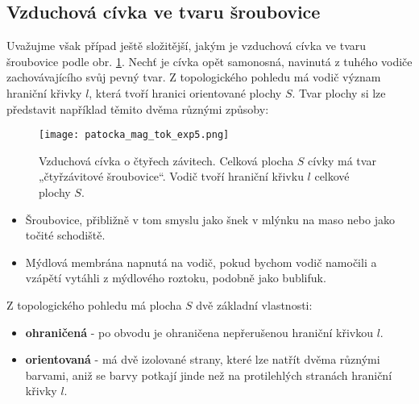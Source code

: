       \subsection{Vzduchová cívka ve tvaru šroubovice}
        Uvažujme však případ ještě složitější, jakým je vzduchová cívka ve tvaru šroubovice podle 
        obr. \ref{es:fig_patocka_mag_tok_exp5}. Nechť je cívka opět samonosná, navinutá z tuhého 
        vodiče zachovávajícího svůj pevný tvar. Z topologického pohledu má vodič význam hraniční 
        křivky \(l\), která tvoří hranici orientované plochy \(S\). Tvar plochy si lze představit 
        například těmito dvěma různými způsoby:
        \begin{figure}[ht!]
          \centering
          \texttt{[image: patocka\_mag\_tok\_exp5.png]}
          \caption{Vzduchová cívka o čtyřech závitech. Celková plocha \(S\) cívky má tvar 
                   „čtyřzávitové šroubovice“. Vodič tvoří hraniční křivku \(l\) celkové plochy 
                   \(S\). \cite[s.~15]{Patocka4}}
          \label{es:fig_patocka_mag_tok_exp5}
        \end{figure}
        \begin{itemize}\addtolength{\itemsep}{-0.5\baselineskip}
          \item Šroubovice, přibližně v tom smyslu jako šnek v mlýnku na maso nebo jako točité 
                schodiště.          
          \item Mýdlová membrána napnutá na vodič, pokud bychom vodič namočili a vzápětí vytáhli
                z mýdlového roztoku, podobně jako bublifuk.
        \end{itemize}
        Z topologického pohledu má plocha \(S\) dvě základní vlastnosti:
        \begin{itemize}\addtolength{\itemsep}{-0.5\baselineskip}
          \item \textbf{ohraničená} - po obvodu je ohraničena nepřerušenou hraniční křivkou \(l\).
          \item \textbf{orientovaná} - má dvě izolované strany, které lze natřít dvěma různými 
                barvami, aniž se barvy potkají jinde než na protilehlých stranách hraniční křivky 
                \(l\).
        \end{itemize}
         
